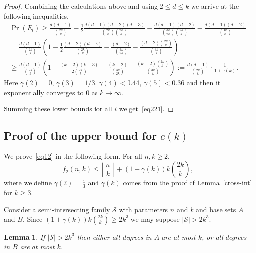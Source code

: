 \documentclass[12pt,a4paper]{amsart}
\numberwithin{equation}{section}
\theoremstyle{plain}
\newtheorem{Lemma}[Th]{Lemma}
\theoremstyle{definition}
\newcommand{\m}{\mathcal}
\newcommand{\trivup}{\left\lfloor\frac{n}{k}\right\rfloor}
\newcommand{\NN}{n}
\begin{document}
\begin{proof}
Combining the calculations above and using $2\leq d\leq k$ we arrive at the following inequalities.
\begin{multline*}
  \Pr(E_i)\geq \frac{d(d-1)}{\binom{2k}{k}}-\frac{1}{2}\frac{d(d-1)(d-2)(d-3)}{\binom{2k}{k}\binom{2k}{k}}
     -\frac{d(d-1)(d-2)}{\binom{3k}{2k}\binom{2k}{k}}-\frac{d(d-1)(d-2)}{\binom{3k}{k}} \\
  =  \frac{d(d-1)}{\binom{2k}{k}} \left(1 - \frac{1}{2}\frac{(d-2)(d-3)}{\binom{2k}{k}}
     -\frac{(d-2)}{\binom{3k}{2k}}-\frac{(d-2)\binom{2k}{k} }{\binom{3k}{k}}\right)\\
  \geq  \frac{d(d-1)}{\binom{2k}{k}} \left(1 - \frac{(k-2)(k-3)}{ 2\binom{2k}{k}}
     -\frac{(k-2)}{\binom{3k}{2k}}-\frac{(k-2)\binom{2k}{k} }{\binom{3k}{k}}\right):= \frac{d(d-1)}{\binom{2k}{k}}\cdot \frac{1} {1+\gamma(k)}.
\end{multline*}
Here $\gamma(2)=0$, $\gamma(3)= 1/3$, $\gamma(4)<0.44$, $\gamma(5)<0.36$ and then it exponentially converges to 0 as $k\to\infty$.

Summing these lower bounds for all $i$ we get~\eqref{eq221}. \end{proof}



\subsection{Proof of the upper bound for $c(k)$}\label{sec_upper}
We prove~\eqref{eq12} in the following form. For all $\NN, k\geq 2$,
\begin{equation*}
  f_2(\NN,k) \leq  \trivup+ (1+\gamma(k))k\binom{2k}{k},
\end{equation*}
where we define $\gamma(2)=\frac{1}{3}$ and $\gamma(k)$ comes from the proof of Lemma~\ref{cross-int} for $k \geq 3$.

Consider a semi-intersecting family $\m{S}$  with parameters $\NN$ and $k$ and base sets $A$ and $B$.
Since $(1+\gamma(k))k\binom{2k}{k} \geq 2k^3$ we may suppose $|\m{S}|> 2k^3$.


\begin{Lemma}\label{gyenge}
If $|\m{S}|> 2k^3$
then either all degrees in $A$ are at most $k$, or all degrees in $B$ are at most $k$.
\end{Lemma}
\end{document}
